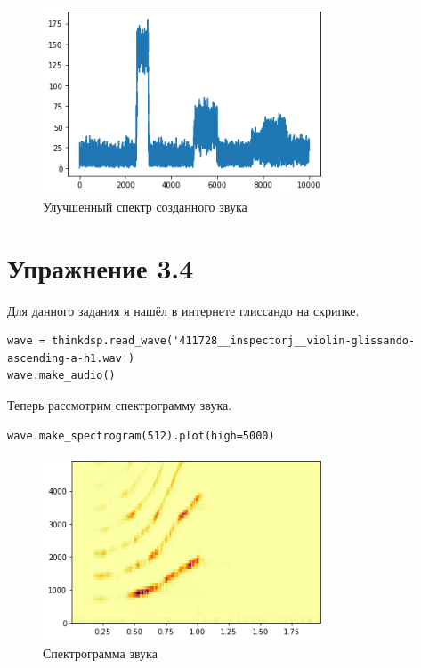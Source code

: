 \documentclass[a4paper,12pt]{report}
\begin{document}
\begin{figure}[H]
        \centering
        \includegraphics[width=0.75\textwidth]{lab3_fig3_2.png}
        \caption{Улучшенный спектр созданного звука}
        \label{fig:lab3_fig3_2}
\end{figure}

\chapter{Упражнение 3.4}

Для данного задания я нашёл в интернете глиссандо на скрипке.

\begin{lstlisting}[caption=Загрузка и прослушивание звука]
wave = thinkdsp.read_wave('411728__inspectorj__violin-glissando-ascending-a-h1.wav')
wave.make_audio()
\end{lstlisting}

Теперь рассмотрим спектрограмму звука.

\begin{lstlisting}[caption=Спектрограмма звука]
wave.make_spectrogram(512).plot(high=5000)
\end{lstlisting}

\begin{figure}[H]
        \centering
        \includegraphics[width=0.75\textwidth]{lab3_fig4_1.png}
        \caption{Спектрограмма звука}
        \label{fig:lab3_fig4_1}
\end{figure}
\end{document}
